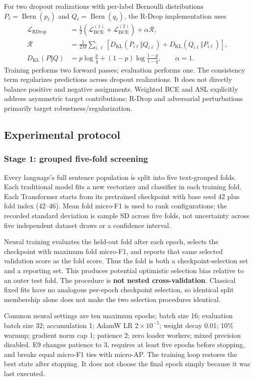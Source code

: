 For two dropout realizations with per-label Bernoulli distributions $P_\ell=\operatorname{Bern}(p_\ell)$ and $Q_\ell=\operatorname{Bern}(q_\ell)$, the R-Drop implementation uses
\begin{align}
\mathcal L_{\mathrm{RDrop}}&=\tfrac12(\mathcal L_{\mathrm{BCE}}^{(1)}+\mathcal L_{\mathrm{BCE}}^{(2)})+\alpha\mathcal R,\\
\mathcal R&=\frac1{2M}\sum_{i,\ell}\left[D_{\mathrm{KL}}(P_{i\ell}\Vert Q_{i\ell})+D_{\mathrm{KL}}(Q_{i\ell}\Vert P_{i\ell})\right],\\
D_{\mathrm{KL}}(P\Vert Q)&=p\log\frac pq+(1-p)\log\frac{1-p}{1-q},\qquad\alpha=1.
\end{align}
Training performs two forward passes; evaluation performs one. The consistency term regularizes predictions across dropout realizations. It does not directly balance positive and negative assignments. Weighted BCE and ASL explicitly address asymmetric target contributions; R-Drop and adversarial perturbations primarily target robustness/regularization.

\subsection{Experimental protocol}
\subsubsection{Stage 1: grouped five-fold screening}
Every language's full sentence population is split into five text-grouped folds. Each traditional model fits a new vectorizer and classifier in each training fold. Each Transformer starts from its pretrained checkpoint with base seed 42 plus fold index (42--46). Mean fold micro-F1 is used to rank configurations; the recorded standard deviation is sample SD across five folds, not uncertainty across five independent dataset draws or a confidence interval.

Neural training evaluates the held-out fold after each epoch, selects the checkpoint with maximum fold micro-F1, and reports that same selected validation score as the fold score. Thus the fold is both a checkpoint-selection set and a reporting set. This produces potential optimistic selection bias relative to an outer test fold. The procedure is \textbf{not nested cross-validation}. Classical fixed fits have no analogous per-epoch checkpoint selection, so identical split membership alone does not make the two selection procedures identical.

Common neural settings are ten maximum epochs; batch size 16; evaluation batch size 32; accumulation 1; AdamW LR $2\times10^{-5}$; weight decay 0.01; 10\% warmup; gradient norm cap 1; patience 2; zero loader workers; mixed precision disabled. E9 changes patience to 3, requires at least five epochs before stopping, and breaks equal micro-F1 ties with micro-AP. The training loop restores the best state after stopping. It does not choose the final epoch simply because it was last executed.

